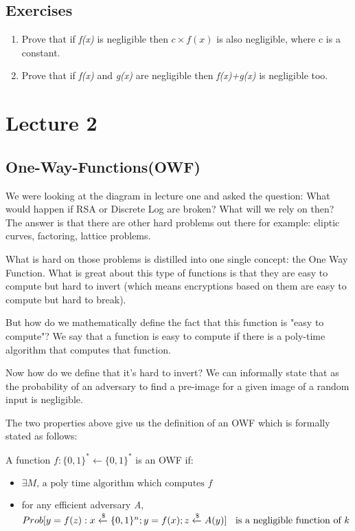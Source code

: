 \documentclass[oneside,a4paper,12pt]{book}
\begin{document}
\section{Exercises}
\begin{enumerate}
\item Prove that if \textit{f(x)} is negligible then $c\times f(x)$ is also negligible, where c is a constant.
\item Prove that if \textit{f(x)} and \textit{g(x)} are negligible then \textit{f(x)+g(x)} is negligible too.
\end{enumerate}

\chapter{Lecture 2} %

\section{One-Way-Functions(OWF)}

We were looking at the diagram in lecture one and asked the question: What would happen if RSA or Discrete Log are broken? What will we rely on then? The answer is that there are other hard problems out there for example: eliptic curves, factoring, lattice problems.

What is hard on those problems is distilled into one single concept: the One Way Function. What is great about this type of functions is that they are easy to compute but hard to invert (which means encryptions based on them are easy to compute but hard to break).

But how do we mathematically define the fact that this function is "easy to compute"? We say that a function is easy to compute if there is a poly-time algorithm that computes that function.

Now how do we define that it's hard to invert? We can informally state that as the probability of an adversary to find a pre-image for a given image of a random input is negligible.

The two properties above give us the definition of an OWF which is formally stated as follows:

A function \begin{math}f:\{0,1\}^*\leftarrow\{0,1\}^*\end{math} is an OWF if:
\begin{itemize}
\item \begin{math}\exists  M \text{, a poly time algorithm which computes } f\end{math}
\item    for any efficient adversary \textit{A},\\ \begin{math} Prob[y=f(z): x \xleftarrow{\$} \{0,1\}^n; y=f(x);z \xleftarrow{\$} A(y)] \text{
    \hspace{2mm}is a negligible function of }k\end{math}
\end{itemize}
\end{document}
